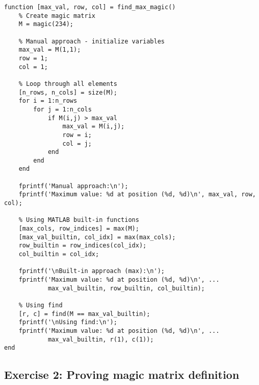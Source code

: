 \documentclass[oneside]{article}
\begin{document}
\begin{verbatim}
function [max_val, row, col] = find_max_magic()
    % Create magic matrix
    M = magic(234);
    
    % Manual approach - initialize variables
    max_val = M(1,1);
    row = 1;
    col = 1;
    
    % Loop through all elements
    [n_rows, n_cols] = size(M);
    for i = 1:n_rows
        for j = 1:n_cols
            if M(i,j) > max_val
                max_val = M(i,j);
                row = i;
                col = j;
            end
        end
    end
    
    fprintf('Manual approach:\n');
    fprintf('Maximum value: %d at position (%d, %d)\n', max_val, row, col);
    
    % Using MATLAB built-in functions
    [max_cols, row_indices] = max(M);
    [max_val_builtin, col_idx] = max(max_cols);
    row_builtin = row_indices(col_idx);
    col_builtin = col_idx;
    
    fprintf('\nBuilt-in approach (max):\n');
    fprintf('Maximum value: %d at position (%d, %d)\n', ...
            max_val_builtin, row_builtin, col_builtin);
    
    % Using find
    [r, c] = find(M == max_val_builtin);
    fprintf('\nUsing find:\n');
    fprintf('Maximum value: %d at position (%d, %d)\n', ...
            max_val_builtin, r(1), c(1));
end
\end{verbatim}

\subsection*{Exercise 2: Proving magic matrix definition}
\end{document}
